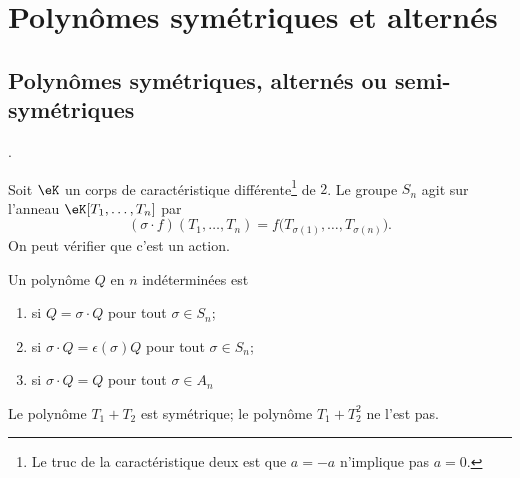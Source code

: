 \section{Polynômes symétriques et alternés}

\subsection{Polynômes symétriques, alternés ou semi-symétriques}
\cite{fJhCTE}.

Soit \( \eK\) un corps de caractéristique différente\footnote{Le truc de la caractéristique deux est que \( a=-a\) n'implique pas \( a=0\).} de \(2\). Le groupe \( S_n\) agit sur l'anneau \( \eK[T_1,\ldots, T_n]\) par
\begin{equation}
    (\sigma\cdot f)(T_1,\ldots, T_n)=f\big( T_{\sigma(1)},\ldots, T_{\sigma(n)} \big).
\end{equation}
On peut vérifier que c'est un action.

\begin{definition}
    Un polynôme \( Q\) en \( n\) indéterminées est
    \begin{enumerate}
        \item
             si \( Q=\sigma\cdot Q\) pour tout \( \sigma\in S_n\);
        \item
             si \( \sigma\cdot Q=\epsilon(\sigma)Q\) pour tout \( \sigma\in S_n\);
        \item
             si \( \sigma\cdot Q=Q\) pour tout \( \sigma\in A_n\)
    \end{enumerate}
\end{definition}
Le polynôme \( T_1+T_2\) est symétrique; le polynôme \( T_1+T_2^2\) ne l'est pas.


